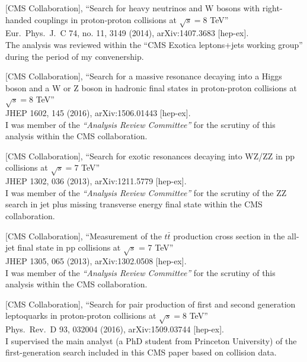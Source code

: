 \documentclass[10pt, a4paper]{article}
\begin{document}
\begin{thebibliography}{599}
  [CMS Collaboration],
 ``Search for heavy neutrinos and $\mathrm {W}$ bosons with
  right-handed couplings in proton-proton collisions at $\sqrt{s}=8$ TeV''\\
  Eur.\ Phys.\ J.\ C 74, no. 11, 3149 (2014), arXiv:1407.3683
  [hep-ex].\\
The analysis was reviewed within the ``CMS Exotica leptons+jets working group'' during
the period of my convenership.

[CMS Collaboration],
``Search for a massive resonance decaying into a Higgs boson and a W or Z boson in hadronic final states in proton-proton collisions at $ \sqrt{s}=8 $ TeV''\\
  JHEP 1602, 145 (2016), arXiv:1506.01443 [hep-ex].
  \\ I was member of the {\it``Analysis Review Committee''} for the scrutiny of this analysis within the CMS collaboration. 

[CMS Collaboration],
 ``Search for exotic resonances decaying into WZ/ZZ in pp collisions at $\sqrt{s}=7$ TeV''\\
 JHEP 1302, 036 (2013), arXiv:1211.5779 [hep-ex].
  \\ I was member of the {\it``Analysis Review Committee''} for the scrutiny of the ZZ search in jet plus missing transverse energy final state within the CMS collaboration. 

[CMS Collaboration],
  ``Measurement of the $t\bar{t}$ production cross section in the all-jet final state in pp collisions at $\sqrt{s}$ = 7 TeV''\\
  JHEP 1305, 065 (2013), arXiv:1302.0508 [hep-ex].
  \\ I was member of the {\it``Analysis Review Committee''} for the scrutiny of this analysis within the CMS collaboration. 

[CMS Collaboration],
``Search for pair production of first and second generation
  leptoquarks in proton-proton collisions at $\sqrt{s}=8$ TeV''\\
  Phys.\ Rev.\ D  93, 032004 (2016), arXiv:1509.03744 [hep-ex].
\\I supervised the main analyst (a PhD student from Princeton University) of the first-generation search included in this CMS paper based on collision data. 


\end{thebibliography}
\end{document}
